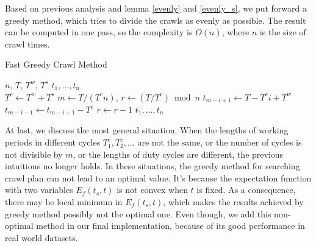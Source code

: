 \documentclass[conference]{IEEEtran}
\begin{document}
Based on previous analysis and lemma \ref{evenly} and \ref{evenly_s}, we put forward a greedy method, which tries to divide the crawls as evenly as possible. 
The result can be computed in one pass, so the complexity is $O(n)$, where $n$ is the size of crawl times.
\begin{algorithm}
	\caption{Fast Greedy Crawl Method}
	\begin{algorithmic}[1]
		\renewcommand{\algorithmicrequire}{\textbf{Input:}}
		\renewcommand{\algorithmicensure}{\textbf{Output:}}
		\REQUIRE $n$, $T$, $T^w$, $T^s$
		\ENSURE  $t_1,\ldots,t_n$
		\\ 
		\STATE $T^{c} \gets T^{w}+T^{s}$
		\STATE $m \gets T/(T^{c} n)$, $r\gets (T/T^{c})\bmod{n}$
		\STATE $t_{m-i+1}\gets T- T^{c} i + T^{w}$
		\STATE $t_{m-i-1}\gets t_{m-i+1}-T^{c}$
		\STATE $r\gets r-1$
		\ENDIF
		\ENDFOR
		\RETURN $t_1,\ldots,t_n$
	\end{algorithmic} 
\end{algorithm}
At last, we discuss the most general situation. 
When the lengths of working periods in different cycles $T^{c}_{1},T^{c}_{2},\hdots$ are not the same, or the number of cycles is not divisible by $m$, or the lengths of duty cycles are different, the previous intuitions no longer holds.
In these situations, the greedy method for searching crawl plan can not lead to an optimal value. 
It's because the expectation function with two variables $E_f(t_s,t)$ is not convex when $t$ is fixed.
As a consequence, there may be local minimum in $E_f(t_s,t)$, which makes the results achieved by greedy method possibly not the optimal one.
Even though, we add this non-optimal method in our final implementation, because of its good performance in real world datasets.
\end{document}
